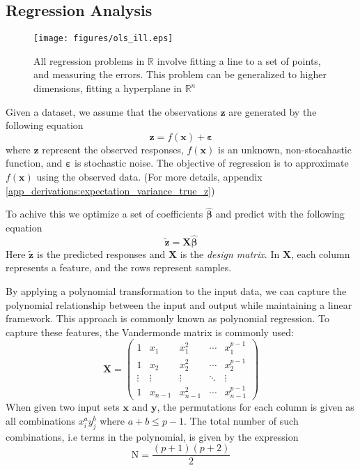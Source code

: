 \documentclass{article}
\begin{document}
\begin{multicols}{2}
\subsection*{Regression Analysis}
\begin{figure}[H]
    \centering
\texttt{[image: figures/ols\_ill.eps]}
    \caption{All regression problems in $\mathbb{R}$ involve fitting a line to a set of points, and measuring the errors. This problem can be generalized to higher dimensions, fitting a hyperplane in $\mathbb{R}^n$}
    \label{fig:ols_illustration}
\end{figure}
Given a dataset, we assume that the observations $\bm{z}$ are generated by the following equation
\begin{equation} \label{eq:given data}
\bm{z} = f(\mathbf{x}) + \boldsymbol{\varepsilon}
\end{equation}
where $\bm{z}$ represent the observed responses, $f(\bm{x})$ is an unknown, non-stocahastic function, and $\bm{\varepsilon}$ is stochastic noise. The objective of regression is to approximate $f(\bm{x})$ using the observed data. (For more details, appendix \ref{app_derivations:expectation_variance_true_z})

To achive this we optimize a set of coefficients $\hat{\boldsymbol{\beta}}$ and predict with the following equation
$$\bm{\tilde{z}} = \mathbf{X} \hat{\boldsymbol{\beta}}$$
Here $\bm{\tilde{z}}$ is the predicted responses and $\mathbf{X}$ is the \textit{design matrix}. In $\mathbf{X}$, each column represents a feature, and the rows represent samples.

By applying a polynomial transformation to the input data, we can capture the polynomial relationship between the input and output while maintaining a linear framework. This approach is commonly known as polynomial regression. To capture these features, the Vandermonde matrix \cite{weisstein_vandermonde_nodate} is commonly used:
$$\mathbf{X} = \begin{pmatrix}
    1 & x_1 & x_1^2 & \cdots & x_1^{p-1} \\
    1 & x_2 & x_2^2 & \cdots & x_2^{p-1} \\
    \vdots & \vdots & \vdots & \ddots & \vdots \\
    1 & x_{n-1} & x_{n-1}^2 & \cdots & x_{n-1}^{p-1}
\end{pmatrix}$$
When given two input sets $\bm{x}$ and $\bm{y}$, the permutations for each column is given as all combinations $x_i^ay_j^b$ where $a + b \leq p-1$. The total number of such combinations, i.e terms in the polynomial, is given by the expression 
$$ \text{N} = \frac{(p + 1)(p+2)}{2} $$ 


\end{multicols}
\end{document}
